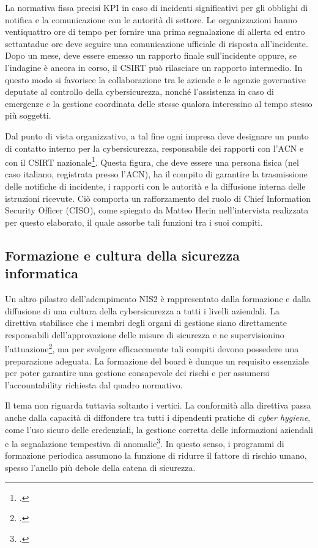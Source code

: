 La normativa fissa precisi KPI in caso di incidenti significativi per gli obblighi di notifica
e la comunicazione con le autorità di settore. 
Le organizzazioni hanno ventiquattro ore di tempo per fornire una prima segnalazione di allerta ed entro
settantadue ore deve seguire una comunicazione ufficiale di risposta all’incidente.
Dopo un mese, deve essere emesso un rapporto finale sull’incidente oppure, se l’indagine è ancora in corso, 
il CSIRT può rilasciare un rapporto intermedio. In questo modo si favorisce la collaborazione tra le aziende e 
le agenzie governative deputate al controllo della cybersicurezza, nonché l'assistenza in caso di emergenze e la gestione
coordinata delle stesse qualora interessino al tempo stesso più soggetti.

Dal punto di vista organizzativo, a tal fine ogni impresa deve designare un punto di contatto interno per la cybersicurezza, 
responsabile dei rapporti con l’ACN e con il CSIRT nazionale\footcite[art. 21]{dlgs138}. 
Questa figura, che deve essere una persona fisica (nel caso italiano, registrata presso l'ACN), ha il compito di garantire la trasmissione 
delle notifiche di incidente, i rapporti con le autorità e la diffusione interna delle 
istruzioni ricevute. Ciò comporta un rafforzamento del ruolo di Chief Information Security Officer (CISO), come spiegato da Matteo Herin
nell'intervista realizzata per questo elaborato, il quale assorbe tali funzioni tra i suoi compiti.


\subsection{Formazione e cultura della sicurezza informatica}
Un altro pilastro dell’adempimento NIS2 è rappresentato dalla formazione e dalla diffusione 
di una cultura della cybersicurezza a tutti i livelli aziendali. 
La direttiva stabilisce che i membri degli organi di gestione siano direttamente responsabili 
dell’approvazione delle misure di sicurezza e ne supervisionino l’attuazione\footcite[art. 20]{nis2-directive}, 
ma per svolgere efficacemente tali compiti devono possedere una preparazione adeguata. 
La formazione del board è dunque un requisito essenziale per poter garantire 
una gestione consapevole dei rischi e per assumersi l’accountability richiesta dal quadro normativo.

Il tema non riguarda tuttavia soltanto i vertici. 
La conformità alla direttiva passa anche dalla capacità di diffondere tra tutti i dipendenti pratiche 
di \textit{cyber hygiene}, come l’uso sicuro delle credenziali, la gestione corretta delle 
informazioni aziendali e la segnalazione tempestiva di anomalie\footcite[pp. 99--103]{enisa-implementing-guidance}. 
In questo senso, i programmi di formazione periodica assumono la funzione di ridurre il fattore 
di rischio umano, spesso l’anello più debole della catena di sicurezza. 



